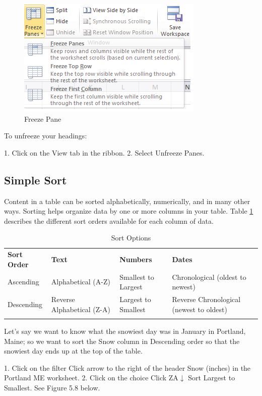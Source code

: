 \begin{figure}[H]
	\centering
	\includegraphics[width=\maxwidth{.95\linewidth}]{gfx/ch05_fig07}
	\caption{Freeze Pane}
	\label{05:fig07}
\end{figure}






To unfreeze your headings:

1. Click on the View tab in the ribbon.
2. Select Unfreeze Panes.

\subsection{Simple Sort}

Content in a table can be sorted alphabetically, numerically, and in many other ways. Sorting helps
organize data by one or more columns in your table. Table \ref{05:tab04} describes the different sort orders available for each column of data.

{\small
	\begin{longtable}{p{0.75in}p{1.0in}p{0.65in}p{0.85in}} %
		\textbf{Sort Order} & \textbf{Text} & \textbf{Numbers} & \textbf{Dates} \endhead
		\hline \\
		Ascending & Alphabetical (A-Z) & Smallest to Largest & Chronological (oldest to newest)\\
		Descending & Reverse Alphabetical (Z-A) & Largest to Smallest & Reverse Chronological (newest to oldest)\\
		\caption{Sort Options}
		\label{05:tab04}
	\end{longtable}
}


Let's say we want to know what the snowiest day was in January in Portland, Maine; so we want to
sort the Snow column in Descending order so that the snowiest day ends up at the top of the table.

1. Click on the filter Click arrow to the right of the header Snow (inches) in the Portland ME
worksheet.
2. Click on the choice Click ZA$ \downarrow $ Sort Largest to Smallest. See Figure 5.8 below.


